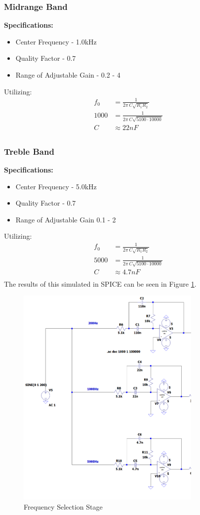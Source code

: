 \documentclass[12pt]{article}
\begin{document}
\subsubsection{Midrange Band}
\noindent \textbf{Specifications:}
\begin{itemize}
	\item Center Frequency - 1.0kHz
	\item Quality Factor - 0.7
	\item Range of Adjustable Gain - 0.2 - 4
\end{itemize}
Utilizing:
\begin{align*}
	f_0  & = \frac{1}{2\pi\,C\sqrt{R_1R_2}}         \\
	1000 & = \frac{1}{2\pi\,C\sqrt{5100\cdot10000}} \\
	C    & \approx 22nF                             \\
\end{align*}
\subsubsection{Treble Band}
\noindent \textbf{Specifications:}
\begin{itemize}
	\item Center Frequency - 5.0kHz
	\item Quality Factor - 0.7
	\item Range of Adjustable Gain 0.1 - 2
\end{itemize}
Utilizing:
\begin{align*}
	f_0  & = \frac{1}{2\pi\,C\sqrt{R_1R_2}}         \\
	5000 & = \frac{1}{2\pi\,C\sqrt{5100\cdot10000}} \\
	C    & \approx 4.7nF                            \\
\end{align*}
The results of this simulated in SPICE can be seen  in Figure \ref{fig:mfbstage}.
\begin{figure}[H]
	\centering
	\includegraphics[width=0.8\textwidth]{mfbstage}
	\caption{Frequency Selection Stage}
	\label{fig:mfbstage}
\end{figure}
\end{document}
